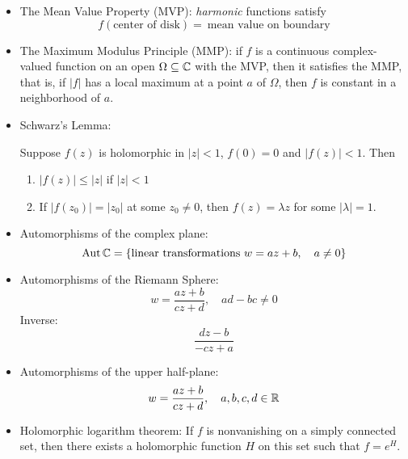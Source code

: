 \documentclass{article}
\begin{document}
\begin{itemize}
  \item The Mean Value Property (MVP): \textit{harmonic} functions satisfy
  \begin{equation}
    f(\text{center of disk}) = \ \text{mean value on boundary}
  \end{equation}

  \item The Maximum Modulus Principle (MMP): if \(f\) is a continuous complex-valued function on an open \(\Omega \subseteq \mathbb{C}\) with the MVP, then it satisfies the MMP, that is, if \(|f|\) has a local maximum at a point \(a\) of \(\Omega\), then \(f\) is constant in a neighborhood of \(a\).

  \item Schwarz's Lemma:
  \begin{theorem}
    Suppose \(f(z)\) is holomorphic in \(|z| < 1\), \(f(0) = 0\) and \(|f(z)| < 1\). Then
    \begin{enumerate}

      \item \(|f(z)| \leq |z|\) if \(|z| < 1\)

      \item If \(|f(z_0)| = |z_0|\) at some \(z_0 \neq 0\), then \(f(z) = \lambda z\) for some \(|\lambda| = 1\).

    \end{enumerate}
  \end{theorem}

  \item Automorphisms of the complex plane:
  \begin{equation}
    \operatorname{Aut}\mathbb{C} = \{\text{linear transformations} \ w = az + b, \quad a \neq 0\}
  \end{equation}

  \item Automorphisms of the Riemann Sphere:
  \begin{equation}
    w = \frac{az + b}{cz + d}, \quad ad - bc \neq 0
  \end{equation}
  Inverse:
  \begin{equation}
    \frac{dz - b}{-cz + a}
  \end{equation}

  \item Automorphisms of the upper half-plane:
  \begin{equation}
    w = \frac{az + b}{cz + d}, \quad a, b, c, d \in \mathbb{R}
  \end{equation}

  \item Holomorphic logarithm theorem:
  If \(f\) is nonvanishing on a simply connected set, then there exists a holomorphic function \(H\) on this set such that \(f = e^H\).

\end{itemize}
\end{document}
